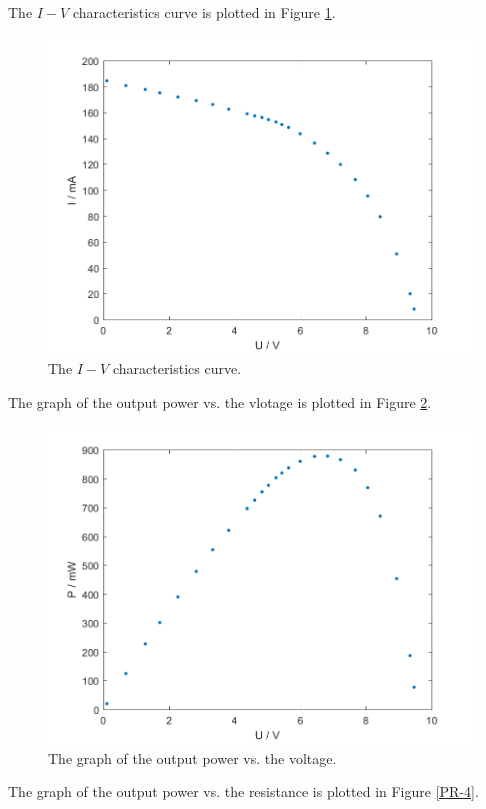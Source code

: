 The $I-V$ characteristics curve is plotted in Figure \ref{IV-4}.
\begin{figure}[H]
\centering
\includegraphics[scale=0.6]{IV4.png}
\caption{The $I-V$ characteristics curve.}
\label{IV-4}
\end{figure}
The graph of the output power vs. the vlotage is plotted in Figure \ref{PV-4}.
\begin{figure}[H]
\centering
\includegraphics[scale=0.6]{PV4.png}
\caption{The graph of the output power vs. the voltage.}
\label{PV-4}
\end{figure}
The graph of the output power vs. the resistance is plotted in Figure \ref{PR-4}.
